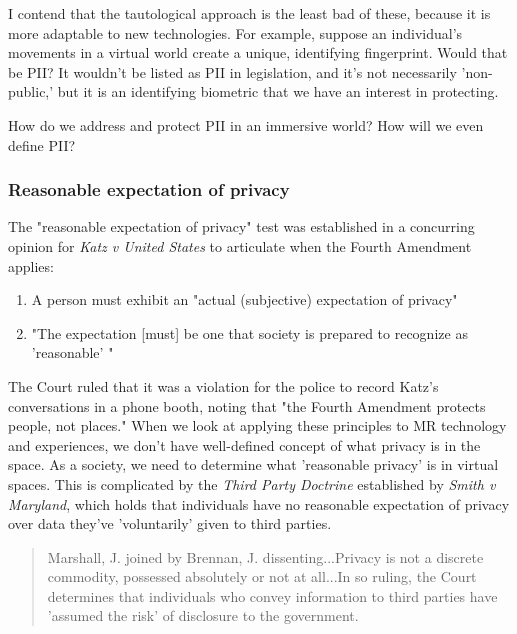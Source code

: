 I contend that the tautological approach is the least bad of these, because it is more adaptable to new technologies. For example, suppose an individual's movements in a virtual world create a unique, identifying fingerprint. Would that be PII? It wouldn't be listed as PII in legislation, and it's not necessarily 'non-public,' but it is an identifying biometric that we have an interest in protecting.

How do we address and protect PII in an immersive world? How will we even define PII?


\subsubsection{Reasonable expectation of privacy}
The "reasonable expectation of privacy" test was established in a concurring opinion for \emph{Katz v United States}\cite{katz1967} to articulate when the Fourth Amendment applies:
\begin{enumerate}
	\item A person must exhibit an "actual (subjective) expectation of privacy"
	\item "The expectation [must] be one that society is  prepared to recognize as 'reasonable' "
\end{enumerate}

The Court ruled that it was a violation for the police to record Katz's conversations in a phone booth, noting that "the Fourth Amendment protects people, not places." When we look at applying these principles to MR technology and experiences, we don't have well-defined concept of what privacy is in the space. As a society, we need to determine what 'reasonable privacy' is in virtual spaces. This is complicated by the \emph{Third Party Doctrine} established by \emph{Smith v Maryland}\cite{1979smith}, which holds that individuals have no reasonable expectation of privacy over data they've 'voluntarily' given to third parties.

\begin{quote}
Marshall, J. joined by Brennan, J. dissenting...Privacy is not a discrete commodity, possessed absolutely or not at all...In so ruling, the Court determines that individuals who convey information to third parties have 'assumed the risk' of disclosure to the government. 
\end{quote}

